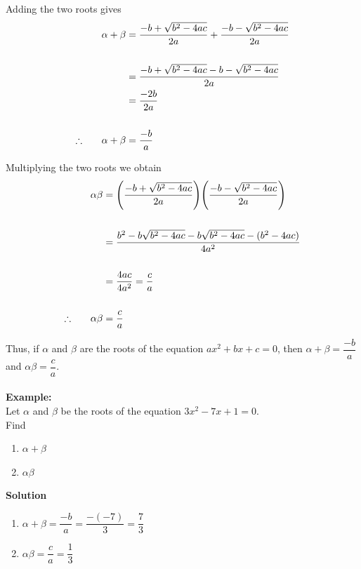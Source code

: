 \documentclass[11pt,a4paper]{article}
\begin{document}
Adding the two roots gives
\begin{align*}
\alpha + \beta & = \frac{-b+\sqrt{b^2-4ac}}{2a}+\frac{-b-\sqrt{b^2-4ac}}{2a}\\\\ 
               & = \frac{-b+\sqrt{b^2-4ac}-b-\sqrt{b^2-4ac}}{2a}\\
               & = \frac{-2b}{2a}\\\\
\therefore \hspace{0.6cm} \alpha + \beta  & =\frac{-b}{a}\\
\end{align*}



Multiplying the two roots we obtain
\begin{align*}
\alpha \beta & = \Bigg(\frac{-b+\sqrt{b^2-4ac}}{2a}\Bigg)\Bigg(\frac{-b-\sqrt{b^2-4ac}}{2a}\Bigg)\\\\
             & = \frac{b^2-b\sqrt{b^2-4ac}-b\sqrt{b^2-4ac}-(b^2-4ac)}{4a^2}\\\\
             & = \frac{4ac}{4a^2}=\frac{c}{a}\\\\
\therefore \hspace{0.6cm} \alpha \beta & = \frac{c}{a}\\
\end{align*}

Thus, if $\alpha$ and $\beta$ are the roots of the equation $ax^2+bx+c=0$, then $\alpha +\beta =\dfrac{-b}{a}$ and $\alpha \beta =\dfrac{c}{a}$.\\\\


\textbf{Example:}\\
Let $\alpha$ and $\beta$ be the roots of the equation $3x^2-7x+1=0$.\\
Find
\begin{enumerate}
\item $\alpha +\beta$
\item $\alpha \beta$\\
\end{enumerate}


\textbf{Solution}
\begin{enumerate}
\item $\alpha +\beta = \dfrac{-b}{a}=\dfrac{-(-7)}{3}=\dfrac{7}{3}$\\

\item $\alpha \beta = \dfrac{c}{a}=\dfrac{1}{3}$\\
\end{enumerate}
\end{document}
